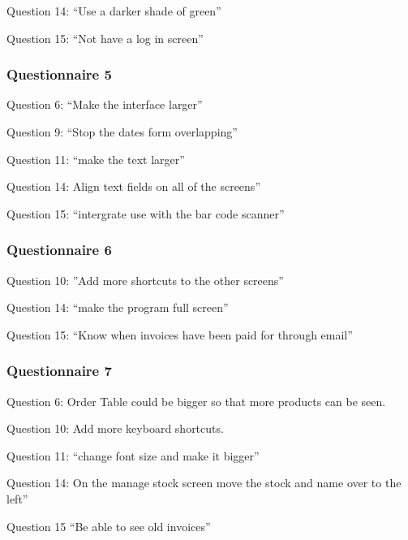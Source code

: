 Question 14: ``Use a darker shade of green''

Question 15: ``Not have a log in screen''

\subsubsection{Questionnaire 5}

Question 6: ``Make the interface larger''

Question 9: ``Stop the dates form overlapping''

Question 11: ``make the text larger''

Question 14: Align text fields on all of the screens''

Question 15: ``intergrate use with the bar code scanner''

\subsubsection{Questionnaire 6}

Question 10: ''Add more shortcuts to the other screens''

Question 14: ``make the program full screen''

Question 15: ``Know when invoices have been paid for through email''

\subsubsection{Questionnaire 7}

Question 6: Order Table could be bigger so that more products can be seen.

Question 10: Add more keyboard shortcuts.

Question 11: ``change font size and make it bigger''

Question 14: On the manage stock screen move the stock and name over to the left''

Question 15 ``Be able to see old invoices''


